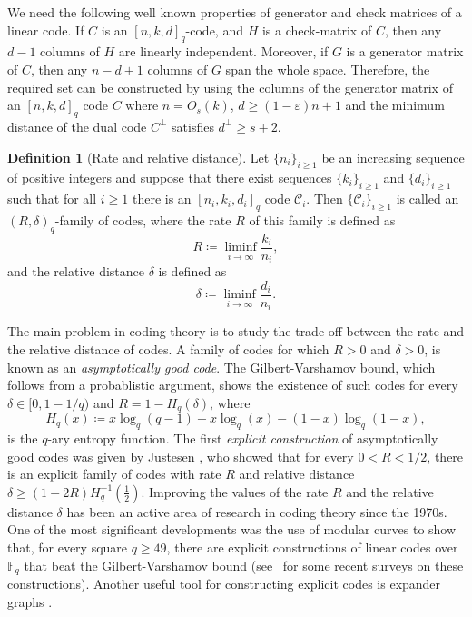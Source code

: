 \documentclass[11pt]{article}
\theoremstyle{plain}
\theoremstyle{definition}
\newtheorem{definition}{Definition}
\begin{document}
We need the following well known properties of generator and check matrices of a linear code. If $C$ is an $[n,k,d]_q$-code, and $H$ is a check-matrix of $C$, then any $d-1$ columns of $H$ are linearly independent. Moreover, if $G$ is a generator matrix of $C$, then any $n-d+1$ columns of $G$ span the whole space.
Therefore, the required set can be constructed by using the columns of the generator matrix of an $[n, k, d]_q$ code $C$ where $n = O_{s}(k)$, $d \geq (1 - \varepsilon) n + 1$ and the minimum distance of the dual code $C^\perp$ satisfies $d^\perp \geq s + 2$. 


\begin{definition}[Rate and relative distance]
Let $\{n_i \}_{i \geq 1}$ be an increasing sequence of positive integers and suppose that there exist sequences $\{k_i\}_{i \geq 1}$ and $\{d_i\}_{i \geq 1}$ such that
for all $i \geq 1$ there is an $[n_i, k_i, d_i]_q$ code $\mathcal{C}_i$. 
Then $\{\mathcal{C}_i\}_{i \geq 1}$ is called an $(R,\delta)_q$-family of codes, where 
the rate $R$ of this family is defined as 
\[R \coloneqq \liminf_{i \rightarrow \infty} \frac{k_i}{n_i},\]
and the relative distance $\delta$ is defined as 
\[\delta \coloneqq \liminf_{i \rightarrow \infty} \frac{d_i}{n_i}.\]
\end{definition}

The main problem in coding theory is to study the trade-off between the rate and the relative distance of codes. 
A family of codes for which $R > 0$ and $\delta > 0$, is known as an \textit{asymptotically good code}. 
The Gilbert-Varshamov bound, which follows from a probablistic argument, shows the existence of such codes for every $\delta \in [0, 1 - 1/q)$ and $R = 1 - H_q(\delta)$, where
\[H_q(x) \coloneqq x \log_q(q - 1) - x \log_q(x)  - (1 - x) \log_q(1 - x),\]
is the $q$-ary entropy function.
The first \textit{explicit construction} of asymptotically good codes was given by  Justesen \cite{justesen1972class}, who showed that for every $0 < R < 1/2$, there is an explicit family of codes with rate $R$ and relative distance $\delta \geq (1 - 2R) H_q^{-1}\left(\frac{1}{2}\right)$. 
Improving the values of the rate $R$ and the relative distance $\delta$ has been an active area of research in coding theory since the 1970s.
One of the most significant developments was the use of modular curves to show that, for every square $q \geq 49$, there are explicit constructions of linear codes over $\mathbb{F}_q$ that beat the Gilbert-Varshamov  bound (see~\cite{couvreur2021algebraic, tsfasman2013algebraic} for some recent surveys on these constructions).
Another useful tool for constructing explicit codes is expander graphs \cite{sipser1996expander}. 
\end{document}
